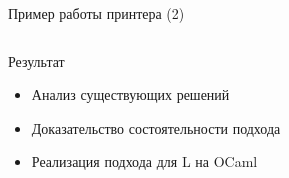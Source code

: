 \documentclass{beamer}
\begin{document}
\begin{frame}{Пример работы принтера (2)}
	\begin{block}{}
		\inputminted{c}{codes/secondTemplatePow.l}
	\end{block}
\end{frame}

\begin{frame}{Результат}
	\begin{itemize}
		\item Анализ существующих решений
		\item Доказательство состоятельности подхода
		\item Реализация подхода для L на OCaml
	\end{itemize}
\end{frame}
\end{document}
